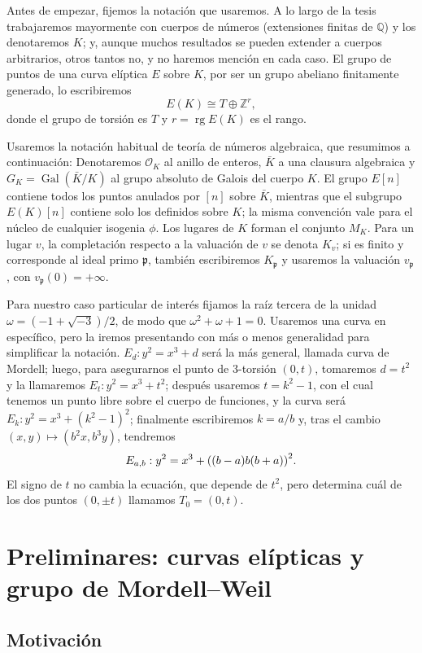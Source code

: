 \documentclass[a4paper]{book}
\theoremstyle{definition}
\theoremstyle{plain}
\DeclareMathOperator{\rg}{rg}
\newcommand{\QQ}{\mathbb{Q}}
\newcommand{\ZZ}{\mathbb{Z}}
\newcommand{\OO}{\mathcal{O}}
\newcommand{\pp}{\mathfrak{p}}
\newcommand{\lp}{\left\lparen}
\newcommand{\rp}{\right\rparen}
\begin{document}
Antes de empezar, fijemos la notación que usaremos. A lo largo de la tesis trabajaremos mayormente con cuerpos de números (extensiones finitas de $\QQ$) y los denotaremos $K$; y, aunque muchos resultados se pueden extender a cuerpos arbitrarios, otros tantos no, y no haremos mención en cada caso. El grupo de puntos de una curva elíptica $E$ sobre $K$, por ser un grupo abeliano finitamente generado, lo escribiremos
\[
E(K)\cong T\oplus\ZZ^r,
\]
donde el grupo de torsión es $T$ y $r=\rg E(K)$ es el rango.

Usaremos la notación habitual de teoría de números algebraica, que resumimos a continuación: Denotaremos $\OO_K$ al anillo de enteros, $\bar K$ a una clausura algebraica y $G_K=\operatorname{Gal}(\bar K/K)$ al grupo absoluto de Galois del cuerpo $K$. El grupo $E[n]$ contiene todos los puntos anulados por $[n]$ sobre $\bar K$, mientras que el subgrupo $E(K)[n]$ contiene solo los definidos sobre $K$; la misma convención vale para el núcleo de cualquier isogenia $\phi$. Los lugares de $K$ forman el conjunto $M_K$. Para un lugar $v$, la completación respecto a la valuación de $v$ se denota $K_v$; si es finito y corresponde al ideal primo $\pp$, también escribiremos $K_\pp$ y usaremos la valuación $v_\pp$, con $v_\pp(0)=+\infty$.

Para nuestro caso particular de interés fijamos la raíz tercera de la unidad $\omega=(-1+\sqrt{-3})/2$, de modo que $\omega^2+\omega+1=0$. Usaremos una curva en específico, pero la iremos presentando con más o menos generalidad para simplificar la notación. $E_d:y^2=x^3+d$ será la más general, llamada curva de Mordell; luego, para asegurarnos el punto de 3-torsión $(0,t)$, tomaremos $d=t^2$ y la llamaremos $E_t:y^2=x^3+t^2$; después usaremos $t=k^2-1$, con el cual tenemos un punto libre sobre el cuerpo de funciones, y la curva será $E_k:y^2=x^3+{(k^2-1)}^2$; finalmente escribiremos $k=a/b$ y, tras el cambio $(x,y)\mapsto(b^2x,b^3y)$, tendremos
\[
E_{a,b}:y^2=x^3+{\lp (b-a)b(b+a)\rp}^2.
\]
El signo de $t$ no cambia la ecuación, que depende de $t^2$, pero determina cuál de los dos puntos $(0,\pm t)$ llamamos $T_0=(0,t)$.

\newpage
\tableofcontents
\newpage


\chapter{Preliminares: curvas elípticas y grupo de Mordell--Weil}\label{cap:mw}

\section{Motivación}\label{sec:motivacion}
\end{document}
